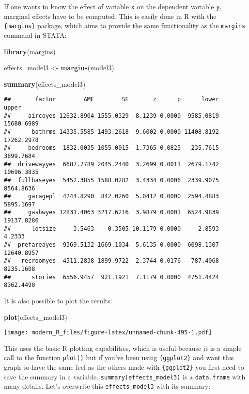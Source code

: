\documentclass[
]{article}
\newenvironment{Shaded}{\begin{snugshade}}{\end{snugshade}}
\newcommand{\KeywordTok}[1]{\textcolor[rgb]{0.13,0.29,0.53}{\textbf{#1}}}
\newcommand{\NormalTok}[1]{#1}
\newcommand{\StringTok}[1]{\textcolor[rgb]{0.31,0.60,0.02}{#1}}
\begin{document}
If one wants to know the effect of variable \texttt{x} on the dependent variable \texttt{y},
marginal effects have to be computed. This is easily done in R with the \texttt{\{margins\}} package, which
aims to provide the same functionality as the \texttt{margins} command in STATA:

\begin{Shaded}
\begin{Highlighting}[]
\KeywordTok{library}\NormalTok{(margins)}

\NormalTok{effects\_model3 \textless{}{-}}\StringTok{ }\KeywordTok{margins}\NormalTok{(model3)}

\KeywordTok{summary}\NormalTok{(effects\_model3)}
\end{Highlighting}
\end{Shaded}

\begin{verbatim}
##       factor        AME        SE       z      p      lower      upper
##     aircoyes 12632.8904 1555.0329  8.1239 0.0000  9585.0819 15680.6989
##      bathrms 14335.5585 1493.2618  9.6002 0.0000 11408.8192 17262.2978
##     bedrooms  1832.0035 1055.0015  1.7365 0.0825  -235.7615  3899.7684
##  drivewayyes  6687.7789 2045.2440  3.2699 0.0011  2679.1742 10696.3835
##  fullbaseyes  5452.3855 1588.0282  3.4334 0.0006  2339.9075  8564.8636
##     garagepl  4244.8290  842.0260  5.0412 0.0000  2594.4883  5895.1697
##     gashwyes 12831.4063 3217.6216  3.9879 0.0001  6524.9839 19137.8286
##      lotsize     3.5463    0.3505 10.1179 0.0000     2.8593     4.2333
##  prefareayes  9369.5132 1669.1034  5.6135 0.0000  6098.1307 12640.8957
##   recroomyes  4511.2838 1899.9722  2.3744 0.0176   787.4068  8235.1608
##      stories  6556.9457  921.1921  7.1179 0.0000  4751.4424  8362.4490
\end{verbatim}

It is also possible to plot the results:

\begin{Shaded}
\begin{Highlighting}[]
\KeywordTok{plot}\NormalTok{(effects\_model3)}
\end{Highlighting}
\end{Shaded}

\texttt{[image: modern\_R\_files/figure-latex/unnamed-chunk-495-1.pdf]}

This uses the basic R plotting capabilities, which is useful because it is a simple call to the
function \texttt{plot()} but if you've been using \texttt{\{ggplot2\}} and want this graph to have the same feel as
the others made with \texttt{\{ggplot2\}} you first need to save the summary in a variable.
\texttt{summary(effects\_model3)} is a \texttt{data.frame} with many details. Let's overwrite this
\texttt{effects\_model3} with its summary:
\end{document}
